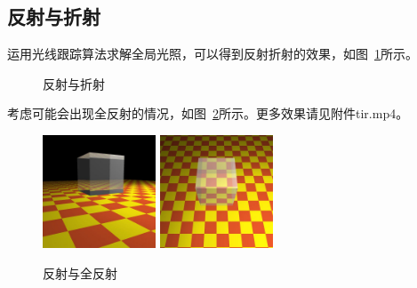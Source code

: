 \documentclass{article}
\begin{document}
\subsection{反射与折射}
运用光线跟踪算法求解全局光照，可以得到反射折射的效果，如图~\ref{fig:rr}所示。
\begin{figure}[H]
  \centering%
  \caption{反射与折射}
  \label{fig:rr}
\end{figure}
\par
考虑可能会出现全反射的情况，如图~\ref{fig:tir}所示。更多效果请见附件tir.mp4。
\begin{figure}[H]
  \centering%
    \includegraphics[width=0.3\textwidth]{18.jpg}
    \includegraphics[width=0.3\textwidth]{19.jpg}
  \caption{反射与全反射}
  \label{fig:tir}
\end{figure}
\end{document}
